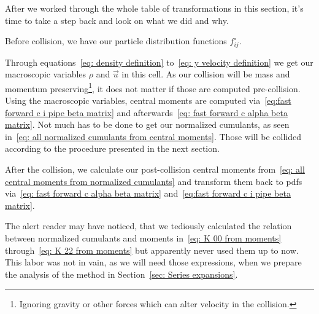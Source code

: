 
After we worked through the whole table of transformations in this section, it's time to take a step back and look on what we did and why.

Before collision, we have our particle distribution functions $f_{ij}^{\circ}$.

Through equations~\eqref{eq: density definition} to~\eqref{eq: y velocity definition} we get our macroscopic variables $\rho$ and $\vec{u}$ in this cell.
As our collision will be mass and momentum preserving\footnote{Ignoring gravity or other forces which can alter velocity in the collision.}, it does not matter if those are computed pre-collision.
Using the macroscopic variables, central moments are computed via~\eqref{eq:fast forward c i pipe beta matrix} and afterwards~\eqref{eq: fast forward c alpha beta matrix}.
Not much has to be done to get our normalized cumulants, as seen in~\eqref{eq: all normalized cumulants from central moments}.
Those will be collided according to the procedure presented in the next section.

After the collision, we calculate our post-collision central moments from~\eqref{eq: all central moments from normalized cumulants}
and transform them back to \glspl{pdf} via~\eqref{eq: fast forward c alpha beta matrix} and~\eqref{eq:fast forward c i pipe beta matrix}.

The alert reader may have noticed, that we tediously calculated the relation between normalized cumulants and moments in~\eqref{eq: K 00 from moments} through~\eqref{eq: K 22 from moments} but apparently never used them up to now.
This labor was not in vain, as we will need those expressions, when we prepare the analysis of the method in Section~\ref{sec: Series expansions}.
